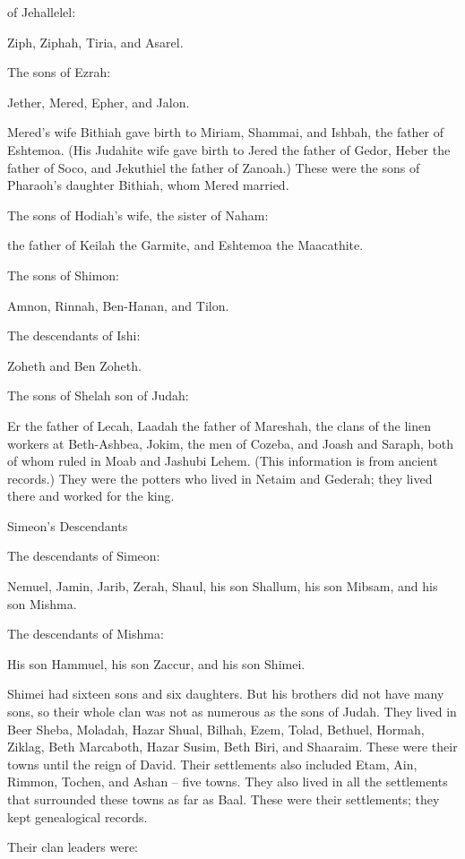 {of Jehallelel:
\par }{\PP Ziph,
Ziphah,
Tiria,
and Asarel.
\par }{\PP {}The sons
of Ezrah:
\par }{\PP Jether,
Mered,
Epher,
and Jalon.
\par }{\PP Mered’s
wife Bithiah gave birth to Miriam,
Shammai,
and Ishbah,
the father
of Eshtemoa.
(His Judahite
wife
gave birth
to Jered
the father
of Gedor,
Heber
the father
of Soco,
and Jekuthiel
the father
of Zanoah.) These
were the sons
of Pharaoh’s
daughter
Bithiah,
whom
Mered
married.
\par }{\PP {}The sons
of Hodiah’s
wife,
the sister
of Naham:
\par }{\PP the father
of Keilah
the Garmite,
and Eshtemoa
the Maacathite.
\par }{\PP {}The sons
of Shimon:
\par }{\PP Amnon,
Rinnah,
Ben-Hanan,
and Tilon.
\par }{\PP The descendants
of Ishi:
\par }{\PP Zoheth
and Ben Zoheth.
\par }{\PP {}The sons
of Shelah
son
of Judah:
\par }{\PP Er
the father
of Lecah,
Laadah
the father
of Mareshah,
the clans
of the linen
workers
at Beth-Ashbea,
Jokim,
the men
of Cozeba,
and Joash
and Saraph,
both of whom
ruled in Moab
and Jashubi Lehem.
(This information
is from ancient records.)
They
were the potters
who lived
in Netaim
and Gederah;
they lived
there
and worked
for the king.
\par }{\SH Simeon’s Descendants
\par }{\PP {}The descendants
of Simeon:
\par }{\PP Nemuel,
Jamin,
Jarib,
Zerah,
Shaul,
his son
Shallum,
his son
Mibsam,
and his son
Mishma.
\par }{\PP {}The descendants
of Mishma:
\par }{\PP His son Hammuel,
his son
Zaccur,
and his son
Shimei.
\par }{\PP {}Shimei
had sixteen
sons
and six
daughters.
But his brothers
did not
have many
sons,
so their whole
clan
was not
as numerous
as
the sons
of Judah.
They lived
in Beer Sheba,
Moladah,
Hazar Shual,
Bilhah,
Ezem,
Tolad,
Bethuel,
Hormah,
Ziklag,
Beth Marcaboth,
Hazar Susim,
Beth Biri,
and Shaaraim.
These
were their towns
until
the reign
of David.
Their settlements
also included Etam,
Ain,
Rimmon,
Tochen,
and Ashan
– five
towns.
They also lived
in all
the settlements
that
surrounded
these
towns
as far
as Baal.
These were their settlements;
they kept genealogical records.
\par }{\PP {}Their clan leaders were:

}
